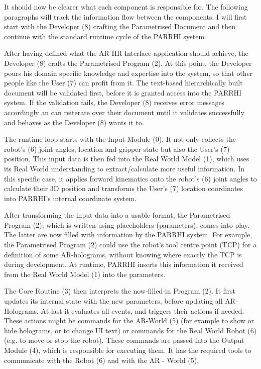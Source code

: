 It should now be clearer what each component is responsible for. The following paragraphs will track the information flow between the components. I will first start with the Developer (8) crafting the Parametrised Document and then continue with the standard runtime cycle of the PARRHI system.

After having defined what the AR-HR-Interface application should achieve, the Developer (8) crafts the Parametrised Program (2). At this point, the Developer pours his domain specific knowledge and expertise into the system, so that other people like the User (7) can profit from it. The text-based hierarchically built document will be validated first, before it is granted access into the PARRHI system. If the validation fails, the Developer (8) receives error messages accordingly an can reiterate over their document until it validates successfully and behaves as the Developer (8) wants it to.

The runtime loop starts with the Input Module (0). It not only collects the robot's (6) joint angles, location and gripper-state but also the User's (7) position. This input data is then fed into the Real World Model (1), which uses its Real World understanding to extract/calculate more useful information. In this specific case, it applies forward kinematics onto the robot's (6) joint angles to calculate their 3D position and transforms the User's (7) location coordinates into PARRHI's internal coordinate system. 

After transforming the input data into a usable format, the Parametrised Program (2), which is written using placeholders (parameters), comes into play. The latter are now filled with information by the PARRHI system. For example, the Parametrised Program (2) could use the robot's tool centre point (TCP) for a definition of some AR-holograms, without knowing where exactly the TCP is during development. At runtime, PARRHI inserts this information it received from the Real World Model (1) into the parameters. 

The Core Routine (3) then interprets the now-filled-in Program (2). It first updates its internal state with the new parameters, before updating all AR-Holograms. At last it evaluates all events, and triggers their actions if needed. These actions might be commands for the AR-World (5) (for example to show or hide holograms, or to change UI text) or commands for the Real World Robot (6) (e.g. to move or stop the robot). These commands are passed into the Output Module (4), which is responsible for executing them. It has the required tools to communicate with the Robot (6) and with the AR - World (5). 

